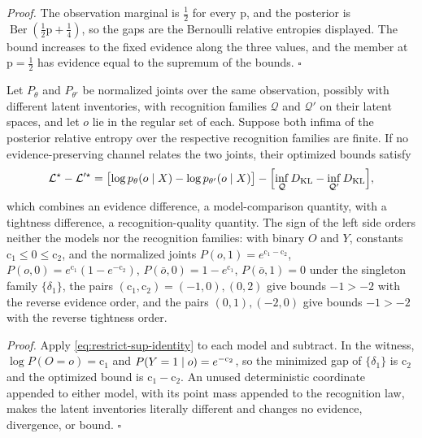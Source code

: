 \noindent\emph{Proof.}
The observation marginal is $\tfrac12$ for every $\mathrm p$, and the posterior
is $\operatorname{Ber}(\tfrac12\mathrm p+\tfrac14)$, so the gaps are the
Bernoulli relative entropies displayed. The bound increases to the fixed
evidence along the three values, and the member at $\mathrm p=\tfrac12$ has
evidence equal to the supremum of the bounds. \hfill$\square$

Let $P_\theta$ and $P_{\theta'}$ be normalized joints over the same observation,
possibly with different latent inventories, with recognition families
$\mathcal Q$ and $\mathcal Q'$ on their latent spaces, and let $o$ lie in the
regular set of each. Suppose both infima of the posterior relative entropy
over the respective recognition families are finite. If no evidence-preserving
channel relates the two joints, their optimized bounds satisfy
\begin{equation}
\mathcal L^\star-\mathcal L'^\star
=\bigl[\log p_\theta(o\mid X)-\log p_{\theta'}(o\mid X)\bigr]
-\Bigl[\inf_{\mathcal Q}D_{\mathrm{KL}}-\inf_{\mathcal Q'}D_{\mathrm{KL}}\Bigr],
\label{eq:restrict-cross-model}
\end{equation}
which combines an evidence difference, a model-comparison quantity, with a
tightness difference, a recognition-quality quantity. The sign of the left side
orders neither the models nor the recognition families: with binary $O$ and $Y$,
constants $\mathrm c_1\leq0\leq\mathrm c_2$, and the normalized joints
$P(o,1)=e^{\mathrm c_1-\mathrm c_2}$, $P(o,0)=e^{\mathrm c_1}(1-e^{-\mathrm c_2})$,
$P(\bar o,0)=1-e^{\mathrm c_1}$, $P(\bar o,1)=0$ under the singleton family
$\{\delta_1\}$, the pairs $(\mathrm c_1,\mathrm c_2)=(-1,0),(0,2)$ give bounds
$-1>-2$ with the reverse evidence order, and the pairs $(0,1),(-2,0)$ give bounds
$-1>-2$ with the reverse tightness order. 

\noindent\emph{Proof.}
Apply \eqref{eq:restrict-sup-identity} to each model and subtract. In the
witness, $\log P(O=o)=\mathrm c_1$ and $P(Y=1\mid o)=e^{-\mathrm c_2}$, so the
minimized gap of $\{\delta_1\}$ is $\mathrm c_2$ and the optimized bound is
$\mathrm c_1-\mathrm c_2$. An unused deterministic coordinate appended to either
model, with its point mass appended to the recognition law, makes the latent
inventories literally different and changes no evidence, divergence, or bound.
\hfill$\square$

